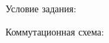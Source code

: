 \documentclass{article}
\begin{document}
Условие задания:

\begin{figure}[h]
\end{figure}
Коммутационная схема:
\end{document}
